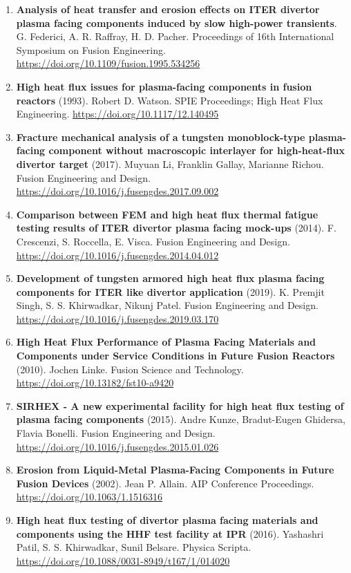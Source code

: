 \documentclass[11pt,a4paper]{article}
\begin{document}
\begin{enumerate}[leftmargin=1.4em]
\item \textbf{Analysis of heat transfer and erosion effects on ITER divertor plasma facing components induced by slow high-power transients}. G. Federici, A. R. Raffray, H. D. Pacher. Proceedings of 16th International Symposium on Fusion Engineering. \url{https://doi.org/10.1109/fusion.1995.534256}
\item \textbf{High heat flux issues for plasma-facing components in fusion reactors} (1993). Robert D. Watson. SPIE Proceedings; High Heat Flux Engineering. \url{https://doi.org/10.1117/12.140495}
\item \textbf{Fracture mechanical analysis of a tungsten monoblock-type plasma-facing component without macroscopic interlayer for high-heat-flux divertor target} (2017). Muyuan Li, Franklin Gallay, Marianne Richou. Fusion Engineering and Design. \url{https://doi.org/10.1016/j.fusengdes.2017.09.002}
\item \textbf{Comparison between FEM and high heat flux thermal fatigue testing results of ITER divertor plasma facing mock-ups} (2014). F. Crescenzi, S. Roccella, E. Visca. Fusion Engineering and Design. \url{https://doi.org/10.1016/j.fusengdes.2014.04.012}
\item \textbf{Development of tungsten armored high heat flux plasma facing components for ITER like divertor application} (2019). K. Premjit Singh, S. S. Khirwadkar, Nikunj Patel. Fusion Engineering and Design. \url{https://doi.org/10.1016/j.fusengdes.2019.03.170}
\item \textbf{High Heat Flux Performance of Plasma Facing Materials and Components under Service Conditions in Future Fusion Reactors} (2010). Jochen Linke. Fusion Science and Technology. \url{https://doi.org/10.13182/fst10-a9420}
\item \textbf{SIRHEX - A new experimental facility for high heat flux testing of plasma facing components} (2015). Andre Kunze, Bradut-Eugen Ghidersa, Flavia Bonelli. Fusion Engineering and Design. \url{https://doi.org/10.1016/j.fusengdes.2015.01.026}
\item \textbf{Erosion from Liquid-Metal Plasma-Facing Components in Future Fusion Devices} (2002). Jean P. Allain. AIP Conference Proceedings. \url{https://doi.org/10.1063/1.1516316}
\item \textbf{High heat flux testing of divertor plasma facing materials and components using the HHF test facility at IPR} (2016). Yashashri Patil, S. S. Khirwadkar, Sunil Belsare. Physica Scripta. \url{https://doi.org/10.1088/0031-8949/t167/1/014020}

\end{enumerate}
\end{document}
